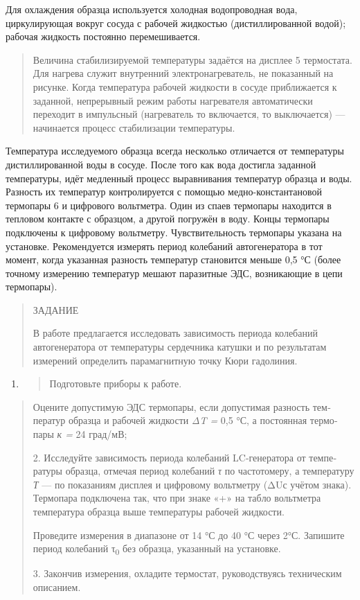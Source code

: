 \documentclass[]{article}
\begin{document}
Для охлаждения образца используется холодная водопроводная во­да,
циркулирующая вокруг сосуда с рабочей жидкостью (дистиллиро­ванной
водой); рабочая жидкость постоянно перемешивается.

\begin{quote}
Величина стабилизируемой температуры задаётся на дисплее 5 тер­мостата.
Для нагрева служит внутренний электронагреватель, не по­казанный на
рисунке. Когда температура рабочей жидкости в сосуде приближается к
заданной, непрерывный режим работы нагревателя ав­томатически переходит
в импульсный (нагреватель то включается, то выключается) --- начинается
процесс стабилизации температуры.
\end{quote}

Температура исследуемого образца всегда несколько отличается от
температуры дистиллированной воды в сосуде. После того как вода
до­стигла заданной температуры, идёт медленный процесс выравнивания
температур образца и воды. Разность их температур контролируется с
помощью медно-константановой термопары 6 и цифрового вольтметра. Один из
спаев термопары находится в тепловом контакте с образцом, а другой
погружён в воду. Концы термопары подключены к цифровому вольтметру.
Чувствительность термопары указана на установке. Реко­мендуется измерять
период колебаний автогенератора в тот момент, когда указанная разность
температур становится меньше 0,5 °С (более точному измерению температур
мешают паразитные ЭДС, возникаю­щие в цепи термопары).

\begin{quote}
ЗАДАНИЕ

В работе предлагается исследовать зависимость периода колебаний
автогенератора от температуры сердечника катушки и по результатам
измерений определить парамагнитную точку Кюри гадолиния.
\end{quote}

\begin{enumerate}
\def\labelenumi{\arabic{enumi}.}
\item
  \begin{quote}
  Подготовьте приборы к работе.
  \end{quote}
\end{enumerate}

\begin{quote}
Оцените допустимую ЭДС термопары, если допустимая разность тем­ператур
образца и рабочей жидкости \emph{ΔT =} 0,5 °С, а постоянная термо­пары
\emph{к =} 24 град/мВ;

2. Исследуйте зависимость периода колебаний LC-генератора от
темпе­ратуры образца, отмечая период колебаний \emph{τ} по частотомеру,
а тем­пературу \emph{Т} --- по показаниям дисплея и цифровому вольтметру
(ΔUс учётом знака). Термопара подключена так, что при знаке «+» на
таб­ло вольтметра температура образца выше температуры рабочей
жид­кости.

Проведите измерения в диапазоне от 14 °С до 40 °С через 2°С. Запишите
период колебаний τ\textsubscript{0} без образца, указанный на установке.

3. Закончив измерения, охладите термостат, руководствуясь техниче­ским
описанием.
\end{quote}
\end{document}

